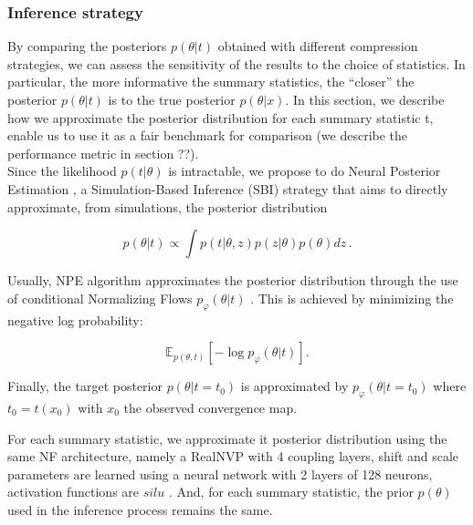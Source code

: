 \documentclass{aa}
\begin{document}
\subsubsection{Inference strategy}

By comparing the posteriors $p(\theta| t)$ obtained with different compression strategies, we can assess the sensitivity of the results to the choice of statistics. In particular, the more informative the summary statistics, the “closer” the posterior $p(\theta | t)$ is to the true posterior $p(\theta | x)$. In this section, we describe how we approximate the posterior distribution for each summary statistic t, enable us to use it as a fair benchmark for comparison (we describe the performance metric in section ??).\\
Since the likelihood $p(t|\theta)$ is intractable, we propose to do Neural Posterior Estimation \citep{npe1, npe2, npe3}, a Simulation-Based Inference (SBI) strategy that aims to directly approximate, from simulations, the posterior distribution 

\begin{equation}
    p(\theta | t) \propto \int p(t | \theta, z) p(z|\theta) p(\theta) dz\,.
\end{equation}

Usually, NPE algorithm approximates the posterior distribution through the use of conditional Normalizing Flows $p_{\varphi} (\theta | t)$ \citep{nf1, nf2}. This is achieved by minimizing the negative log probability: 

\begin{equation}
    \mathbb{E}_{p(\theta, t)} \left[ - \log p_{\varphi} (\theta | t)  \right].
    \label{eq:nll}
\end{equation}

Finally, the target posterior $p(\theta | t = t_0)$ is approximated by $p_{\varphi}(\theta | t = t_0)$ where $t_0 = t(x_0)$ with $x_0$ the observed convergence map.

For each summary statistic, we approximate it posterior distribution using the same NF architecture, namely a RealNVP \citep{realnvp} with 4 coupling layers, shift and scale parameters are learned using a neural network with 2 layers of 128 neurons, activation functions are $silu$ \citep{silu}. And, for each summary statistic, the prior $p(\theta)$ used in the inference process remains the same.
\end{document}
